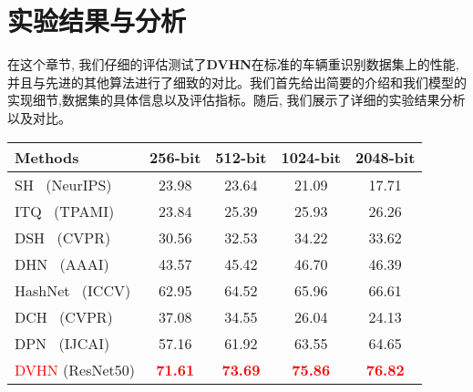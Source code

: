 \section{实验结果与分析}
在这个章节, 我们仔细的评估测试了\textbf{DVHN}在标准的车辆重识别数据集上的性能, 并且与先进的其他算法进行了细致的对比。我们首先给出简要的介绍和我们模型的实现细节,数据集的具体信息以及评估指标。随后, 我们展示了详细的实验结果分析以及对比。
\begin{table}[!htpb]
    \centering
    \begin{tabular}{cccccc}
       \\ \hline
    \multicolumn{2}{l|}{Methods} & 256-bit & 512-bit & 1024-bit & 2048-bit   \\\hline
    \multicolumn{2}{l|}{SH~\cite{weiss2008spectral} (NeurIPS)} & 23.98 & 23.64 & 21.09 & 17.71  \\  
    \multicolumn{2}{l|}{ITQ~\cite{gong2012iterative} (TPAMI)} & 23.84 & 25.39 & 25.93 & 26.26  \\  
    \hline
    \hline
    \multicolumn{2}{l|}{DSH~\cite{liu2016deep} (CVPR)} & 30.56 & 32.53 & 34.22 & 33.62  \\
    \multicolumn{2}{l|}{DHN~\cite{zhu2016deep} (AAAI)} & 43.57 & 45.42 & 46.70 & 46.39  \\
    \multicolumn{2}{l|}{HashNet~\cite{cao2017hashnet} (ICCV)} & 62.95 & 64.52 & 65.96 & 66.61  \\
    \multicolumn{2}{l|}{DCH~\cite{cao2018deep} (CVPR)} & 37.08 & 34.55 & 26.04 & 24.13  \\
    \multicolumn{2}{l|}{DPN~\cite{fan2020deep} (IJCAI)} & 57.16 & 61.92 & 63.55 & 64.65  \\
    \hline
    \hline
     \multicolumn{2}{l|}{\textcolor{red}{DVHN} (ResNet50) }&\textcolor{red}{\textbf{71.61}} & \textcolor{red}{\textbf{73.69}} & \textcolor{red}{\textbf{75.86}} & \textcolor{red}{\textbf{76.82}} \\
     \hline
     \hline
    \end{tabular}
    \label{table:vid800}
  \end{table}
